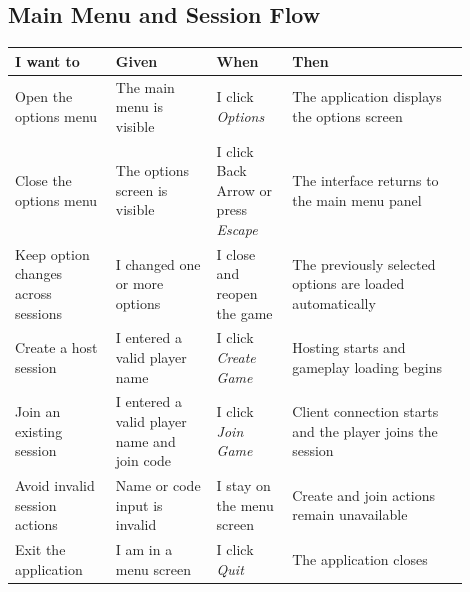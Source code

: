 \subsection*{Main Menu and Session Flow}
\begin{table}[H]
\centering
\caption{User Stories: Main Menu and Session Flow}
\label{tab:userstories-main-menu}
\begin{longtable}{|>{\centering\arraybackslash}m{0.20\linewidth}|>{\centering\arraybackslash}m{0.20\linewidth}|>{\centering\arraybackslash}m{0.15\linewidth}|>{\centering\arraybackslash}m{0.35\linewidth}|}
\hline
\hline
\textbf{I want to} & \textbf{Given} & \textbf{When} & \textbf{Then} \\
\hline
Open the options menu & The main menu is visible & I click \textit{Options} & The application displays the options screen \\
\hline
Close the options menu & The options screen is visible & I click Back Arrow or press \textit{Escape} & The interface returns to the main menu panel \\
\hline
Keep option changes across sessions & I changed one or more options & I close and reopen the game & The previously selected options are loaded automatically \\
\hline
Create a host session & I entered a valid player name & I click \textit{Create Game} & Hosting starts and gameplay loading begins \\
\hline
Join an existing session & I entered a valid player name and join code & I click \textit{Join Game} & Client connection starts and the player joins the session \\
\hline
Avoid invalid session actions & Name or code input is invalid & I stay on the menu screen & Create and join actions remain unavailable \\
\hline
Exit the application & I am in a menu screen & I click \textit{Quit} & The application closes \\
\hline
\end{longtable}
\addtocounter{table}{-1}
\end{table}

